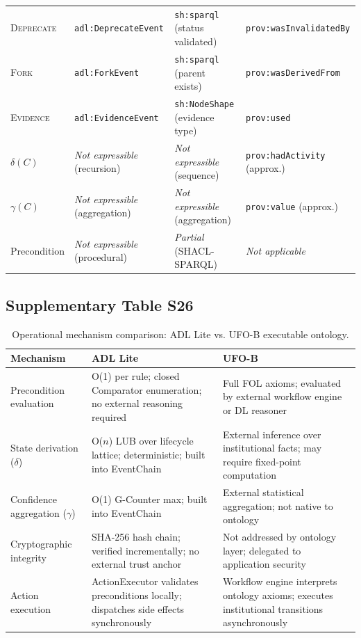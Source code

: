 \begin{table}[htbp]
\begin{tabularx}{\textwidth}{@{}p{2.8cm}p{2.8cm}p{3.2cm}p{3.2cm}@{}}
\textsc{Deprecate} & \texttt{adl:DeprecateEvent} & \texttt{sh:sparql} (status validated) & \texttt{prov:wasInvalidatedBy} \\
\textsc{Fork} & \texttt{adl:ForkEvent} & \texttt{sh:sparql} (parent exists) & \texttt{prov:wasDerivedFrom} \\
\textsc{Evidence} & \texttt{adl:EvidenceEvent} & \texttt{sh:NodeShape} (evidence type) & \texttt{prov:used} \\
$\delta(C)$ & \emph{Not expressible} (recursion) & \emph{Not expressible} (sequence) & \texttt{prov:hadActivity} (approx.) \\
$\gamma(C)$ & \emph{Not expressible} (aggregation) & \emph{Not expressible} (aggregation) & \texttt{prov:value} (approx.) \\
Precondition & \emph{Not expressible} (procedural) & \emph{Partial} (SHACL-SPARQL) & \emph{Not applicable} \\
\bottomrule
\end{tabularx}
\end{table}

\subsection{Supplementary Table S26}\label{tab:S26}
\begin{table}[htbp]
\centering
\small
\caption{Operational mechanism comparison: ADL Lite vs. UFO-B executable ontology.}
\label{tab:operational-vs-ufob}
\begin{tabularx}{\textwidth}{@{}p{3.2cm}p{4.8cm}p{4.8cm}@{}}
\toprule
\textbf{Mechanism} & \textbf{ADL Lite} & \textbf{UFO-B} \\
\midrule
Precondition evaluation & O(1) per rule; closed Comparator enumeration; no external reasoning required & Full FOL axioms; evaluated by external workflow engine or DL reasoner \\
State derivation ($\delta$) & O($n$) LUB over lifecycle lattice; deterministic; built into EventChain & External inference over institutional facts; may require fixed-point computation \\
Confidence aggregation ($\gamma$) & O(1) G-Counter max; built into EventChain & External statistical aggregation; not native to ontology \\
Cryptographic integrity & SHA-256 hash chain; verified incrementally; no external trust anchor & Not addressed by ontology layer; delegated to application security \\
Action execution & ActionExecutor validates preconditions locally; dispatches side effects synchronously & Workflow engine interprets ontology axioms; executes institutional transitions asynchronously \\
\bottomrule
\end{tabularx}
\end{table}

